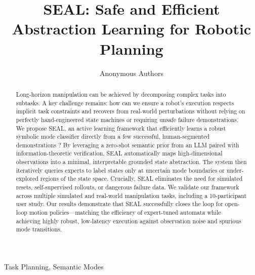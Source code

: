 \documentclass[journal]{IEEEtran}
\begin{document}
\title{SEAL: Safe and Efficient Abstraction Learning for Robotic Planning}


\author{Anonymous Authors%
}

\maketitle



\begin{abstract}
Long-horizon manipulation can be achieved by decomposing complex tasks into subtasks. A key challenge remains: how can we ensure a robot's execution respects implicit task constraints and recovers from real-world perturbations without relying on perfectly hand-engineered state machines or requiring unsafe failure demonstrations. We propose SEAL, an active learning framework that efficiently learns a robust symbolic mode classifier directly from a few successful, human-segmented demonstrations ? By leveraging a zero-shot semantic prior from an LLM paired with information-theoretic verification, SEAL automatically maps high-dimensional observations into a minimal, interpretable grounded state abstraction. The system then iteratively queries experts to label states only at uncertain mode boundaries or under-explored regions of the state space. Crucially, SEAL eliminates the need for simulated resets, self-supervised rollouts, or dangerous failure data. We validate our framework across multiple simulated and real-world manipulation tasks, including a 10-participant user study. Our results demonstrate that SEAL successfully closes the loop for open-loop motion policies—matching the efficiency of expert-tuned automata while achieving highly robust, low-latency execution against observation noise and spurious mode transitions.

\end{abstract}

\begin{IEEEkeywords}
Task Planning, Semantic Modes 
\end{IEEEkeywords}
\end{document}
